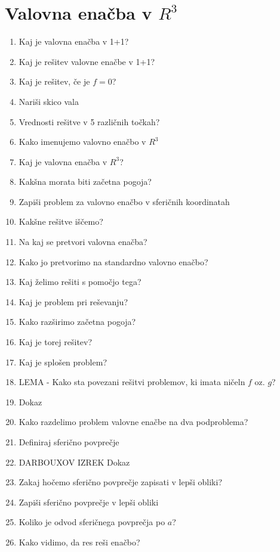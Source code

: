 \documentclass{article}
\begin{document}
    \section{Valovna enačba v $R^3$}
    \begin{enumerate}
        \item Kaj je valovna enačba v 1+1?
        \item Kaj je rešitev valovne enačbe v 1+1?
        \item Kaj je rešitev, če je $f = 0$?
        \item Nariši skico vala 
        \item Vrednosti rešitve v 5 različnih točkah?
        \item Kako imenujemo valovno enačbo v $R^3$ 
        \item Kaj je valovna enačba v $R^3$?
        \item Kakšna morata biti začetna pogoja?
        \item Zapiši problem za valovno enačbo v sferičnih koordinatah
        \item Kakšne rešitve iščemo?
        \item Na kaj se pretvori valovna enačba?
        \item Kako jo pretvorimo na standardno valovno enačbo?
        \item Kaj želimo rešiti s pomočjo tega?
        \item Kaj je problem pri reševanju?
        \item Kako razširimo začetna pogoja?
        \item Kaj je torej rešitev?
        \item Kaj je splošen problem?
        \item LEMA - Kako sta povezani rešitvi problemov, ki imata ničeln $f$ oz. $g$?
        \item Dokaz
        \item Kako razdelimo problem valovne enačbe na dva podproblema?
        \item Definiraj sferično povprečje
        \item DARBOUXOV IZREK
        Dokaz
        \item Zakaj hočemo sferično povprečje zapisati v lepši obliki?
        \item Zapiši sferično povprečje v lepši obliki
        \item Koliko je odvod sferičnega povprečja po $a$?
        \item Kako vidimo, da res reši enačbo?

\end{enumerate}
\end{document}
